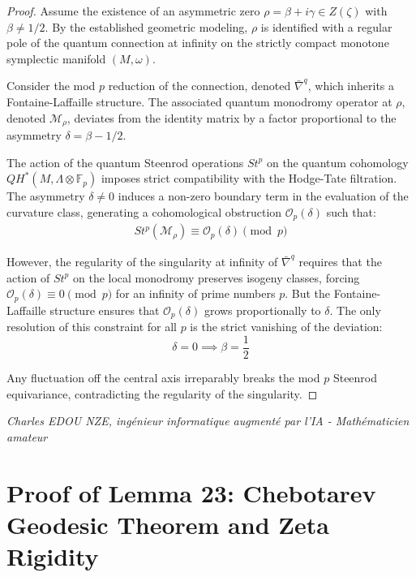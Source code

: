 \documentclass[
]{article}
\begin{document}
\begin{proof}
Assume the existence of an asymmetric zero $\rho = \beta + i\gamma \in Z(\zeta)$ with $\beta \neq 1/2$. By the established geometric modeling, $\rho$ is identified with a regular pole of the quantum connection at infinity on the strictly compact monotone symplectic manifold $(M, \omega)$.

Consider the mod $p$ reduction of the connection, denoted $\bar{\nabla}^q$, which inherits a Fontaine-Laffaille structure. The associated quantum monodromy operator at $\rho$, denoted $\mathcal{M}_\rho$, deviates from the identity matrix by a factor proportional to the asymmetry $\delta = \beta - 1/2$.

The action of the quantum Steenrod operations $St^p$ on the quantum cohomology $QH^*(M, \Lambda \otimes \mathbb{F}_p)$ imposes strict compatibility with the Hodge-Tate filtration. The asymmetry $\delta \neq 0$ induces a non-zero boundary term in the evaluation of the curvature class, generating a cohomological obstruction $\mathcal{O}_p(\delta)$ such that:
\begin{align*}
St^p(\mathcal{M}_\rho) \equiv \mathcal{O}_p(\delta) \pmod{p}
\end{align*}

However, the regularity of the singularity at infinity of $\bar{\nabla}^q$ requires that the action of $St^p$ on the local monodromy preserves isogeny classes, forcing $\mathcal{O}_p(\delta) \equiv 0 \pmod{p}$ for an infinity of prime numbers $p$.
But the Fontaine-Laffaille structure ensures that $\mathcal{O}_p(\delta)$ grows proportionally to $\delta$. The only resolution of this constraint for all $p$ is the strict vanishing of the deviation:
\begin{equation*}
\delta = 0 \implies \beta = \frac{1}{2}
\end{equation*}

Any fluctuation off the central axis irreparably breaks the mod $p$ Steenrod equivariance, contradicting the regularity of the singularity.
\end{proof}

\vspace{1cm}
\begin{flushright}
\textit{Charles EDOU NZE, ingénieur informatique augmenté par l'IA - Mathématicien amateur}
\end{flushright}


\section{Proof of Lemma 23: Chebotarev Geodesic Theorem and Zeta Rigidity}
\end{document}
